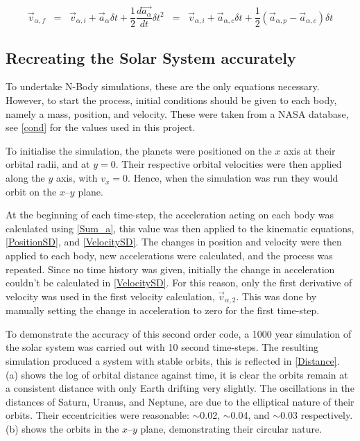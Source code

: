\documentclass[a4paper,10pt]{article}
\begin{document}
\begin{equation} \label{VelocitySD}
     \vec{v}_{\alpha,f} \;\; =  \;\; \vec{v}_{\alpha,i} + \vec{a}_{\alpha} \delta t + \frac{1}{2}\frac{d\vec{a_\alpha}}{dt}\delta t^2 \;\; = \;\; \vec{v}_{\alpha,i} + \vec{a}_{\alpha,c} \delta t + \frac{1}{2}(\vec{a}_{\alpha,p} - \vec{a}_{\alpha,c})\delta t
\end{equation}

\subsection{Recreating the Solar System accurately}

To undertake N-Body simulations, these are the only equations necessary. However, to start the process, initial conditions should be given to each body, namely a mass, position, and velocity. These were taken from a NASA database\cite{PlanetFacts}, see \cref{cond} for the values used in this project.  

To initialise the simulation, the planets were positioned on the $x$ axis at their orbital radii, and at $y=0$. Their respective orbital velocities were then applied along the $y$ axis, with $v_x = 0$. Hence, when the simulation was run they would orbit on the $x$--$y$ plane. 

At the beginning of each time-step, the acceleration acting on each body was calculated using \cref{Sum_a}, this value was then applied to the kinematic equations, \cref{PositionSD}, and \cref{VelocitySD}. The changes in position and velocity were then applied to each body, new accelerations were calculated, and the process was repeated. Since no time history was given, initially the change in acceleration couldn't be calculated in \cref{VelocitySD}. For this reason, only the first derivative of velocity was used in the first velocity calculation, $\vec v_{\alpha,2}$. This was done by manually setting the change in acceleration to zero for the first time-step.

To demonstrate the accuracy of this second order code, a 1000 year simulation of the solar system was carried out with 10 second time-steps. The resulting simulation produced a system with stable orbits, this is reflected in \cref{Distance}.  (a) shows the log of orbital distance against time, it is clear the orbits remain at a consistent distance with only Earth drifting very slightly. The oscillations in the distances of Saturn, Uranus, and Neptune, are due to the elliptical nature of their orbits. Their eccentricities were reasonable: $\sim$0.02, $\sim$0.04, and $\sim$0.03 respectively.  (b) shows the orbits in the $x$--$y$ plane, demonstrating their circular nature. 
\end{document}
